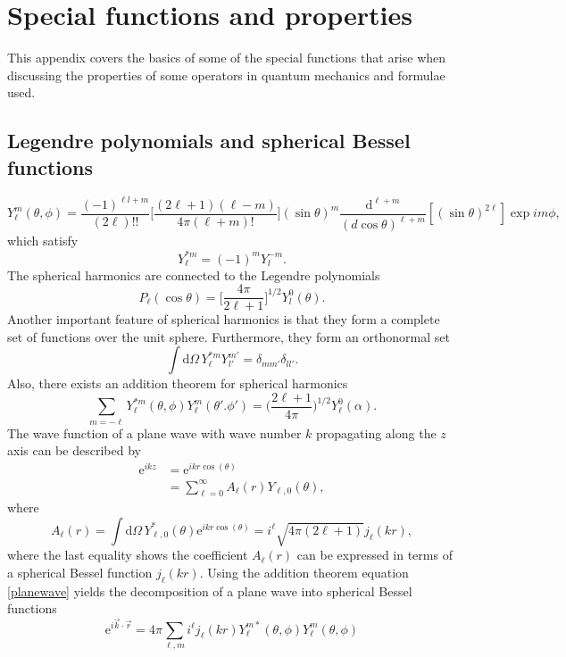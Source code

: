 \chapter{Special functions and properties}
This appendix covers the basics of some of the special functions that arise when discussing the properties of some operators in quantum mechanics and formulae used.
\section{Legendre polynomials and spherical Bessel functions}\label{app:Bessel}
\begin{equation}
	Y_{\ell}^m(\theta,\phi) = \frac{(-1)^{{\ell}l+m}}{(2\ell)!!}\bigg[ \frac{(2\ell+1)(\ell-m)}{4\pi(\ell+m)!}\bigg](\sin\theta)^m\frac{\text{d}^{\ell+m}}{(d\cos\theta)^{\ell+m}}[(\sin\theta)^{2\ell}]\exp{i m\phi},
\end{equation}
which satisfy
\begin{equation}
	Y_\ell^{*m}=(-1)^m Y_{l}^{-m}.
\end{equation}
The spherical harmonics are connected to the Legendre polynomials
\begin{equation}
	P_\ell(\cos\theta) = \bigg[ \frac{4\pi}{2\ell+1} \bigg]^{1/2}Y_{l}^0(\theta).
\end{equation}
Another important feature of spherical harmonics is that they form a complete set of functions over the unit sphere. Furthermore, they form an orthonormal set
\begin{equation}\label{orthset}
	\int \text{d}\Omega \, Y_\ell^{*m} Y_{l'}^{m'} = \delta_{mm'}\delta_{ll'}.
\end{equation}
Also, there exists an addition theorem for spherical harmonics
\begin{equation}\label{addition}
	\sum_{m=-\ell} Y_\ell^{*m}(\theta,\phi)Y_\ell^{m}(\theta'.\phi') = \bigg( \frac{2\ell+1}{4\pi}\bigg)^{1/2}Y_\ell^0(\alpha).
\end{equation}
The wave function of a plane wave with wave number $k$ propagating along the $z$ axis can be described by
\begin{align} \label{planewave}
	\text{e}^{ikz}  &= \text{e}^{ikr \cos(\theta)}  \\
	&= \sum_{\ell=0}^\infty A_\ell(r)Y_{\ell,0}(\theta),
\end{align}
where
\begin{equation} \label{besselcoef}
	A_\ell(r) = \int \text{d}\Omega \, Y_{\ell,0}^*(\theta)\text{e}^{ikr\cos(\theta)}  = i^\ell\sqrt{4\pi(2\ell+1)}j_\ell(kr),
\end{equation}
where the last equality shows the coefficient $A_\ell(r)$ can be expressed in terms of a spherical Bessel function $j_\ell(kr)$. Using the addition theorem equation \eqref{planewave} yields the decomposition of a plane wave into spherical Bessel functions
\begin{equation} \label{sphericalbesseldecomp}
	\text{e}^{i\vec{k}\cdot\vec{r}} = 4\pi \sum_{\ell,m}i^\ell j_\ell(kr)Y_\ell^{m*}(\theta,\phi)Y_\ell^{m}(\theta,\phi)
\end{equation}
